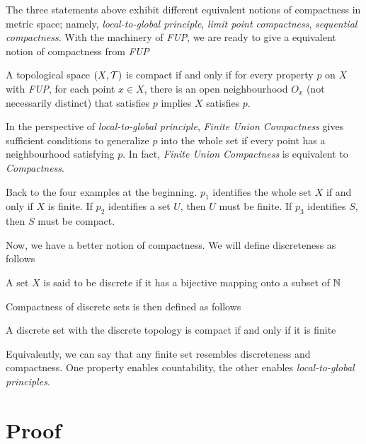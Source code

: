 \documentclass{article}
\begin{document}
The three statements above exhibit different equivalent notions of compactness in metric space; namely, \emph{local-to-global principle}, \emph{limit point compactness}, \emph{sequential compactness}. With the machinery of \emph{FUP}, we are ready to give a equivalent notion of compactness from \emph{FUP}


\begin{proposition}
    \label{prop:compact_new}
    A topological space $(X, \mathcal{T})$ is compact if and only if for every property $p$ on $X$ with \emph{FUP}, for each point $x \in X$, there is an open neighbourhood $O_x$ (not necessarily distinct) that satisfies $p$ implies $X$ satisfies $p$.
\end{proposition}

In the perspective of \emph{local-to-global principle}, \emph{Finite Union Compactness} gives sufficient conditions to generalize $p$ into the whole set if every point has a neighbourhood satisfying $p$. In fact, \emph{Finite Union Compactness} is equivalent to \emph{Compactness}.

Back to the four examples at the beginning. $p_1$ identifies the whole set $X$ if and only if $X$ is finite. If $p_2$ identifies a set $U$, then $U$ must be finite. If $p_3$ identifies $S$, then $S$ must be compact.


Now, we have a better notion of compactness. We will define discreteness as follows

\begin{definition}[Discreteness]
    A set $X$ is said to be discrete if it has a bijective mapping onto a subset of $\mathbb{N}$
\end{definition}

Compactness of discrete sets is then defined as follows

\begin{proposition}
    \label{prop:compact_n}
    A discrete set with the discrete topology is compact if and only if it is finite
\end{proposition}

Equivalently, we can say that any finite set resembles discreteness and compactness. One property enables countability, the other enables \emph{local-to-global principles}.


\section{Proof}
\end{document}
